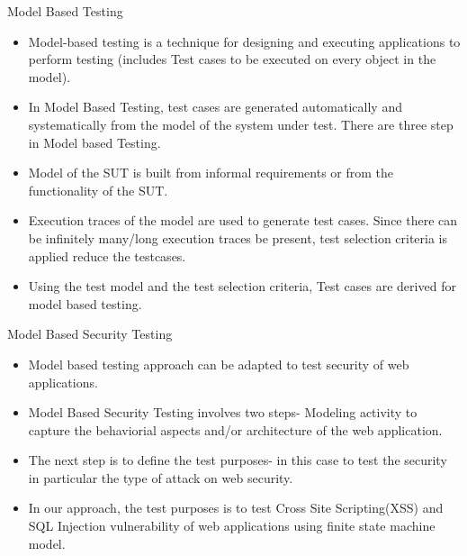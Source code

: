 \documentclass{beamer}
\begin{document}
\begin{frame}{Model Based Testing}
\begin{itemize}
\item Model-based testing is a technique for designing and executing applications to perform testing (includes Test cases to be executed on every object in the model).
\item In Model Based Testing, test cases are generated automatically and systematically from the model of the system under test. There are three step in Model based Testing.
\item Model of the SUT is built from informal requirements or from the functionality of the SUT. 
\item Execution traces of the model are used to generate test cases. Since there can be infinitely many/long execution traces be present, test selection criteria is applied reduce the testcases. 
\item Using the test model and the test selection criteria, Test cases are derived for model based testing. 
\end{itemize}    
\end{frame}

\begin{frame}{Model Based Security Testing}
  \begin{itemize}
  \item Model based testing approach can be adapted to test security of web applications. 
  \item Model Based Security Testing involves two steps- Modeling activity to capture the behaviorial aspects and/or architecture of the web application. 
  \item The next step is to define the test purposes- in this case to test the security in particular the type of attack on web security.
  \item In our approach, the test purposes is to test Cross Site Scripting(XSS) and SQL Injection vulnerability of web applications using finite state machine model.
  
  \end{itemize}
\end{frame}
\end{document}
